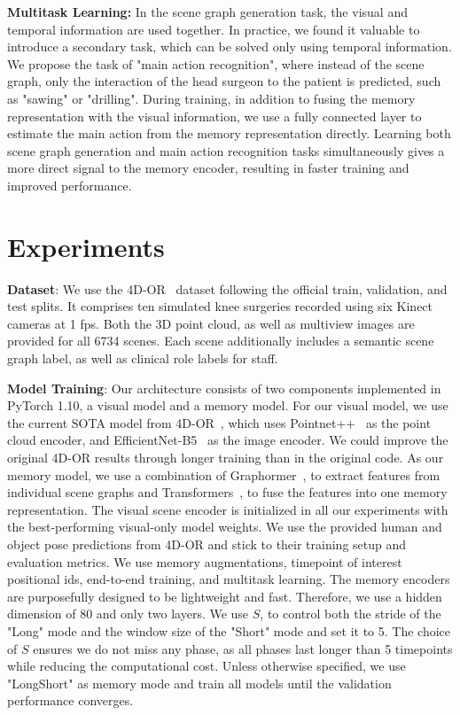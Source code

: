 \documentclass[runningheads]{llncs}
\begin{document}
\noindent \textbf{Multitask Learning:}
In the scene graph generation task, the visual and temporal information are used together. In practice, we found it valuable to introduce a secondary task, which can be solved only using temporal information. We propose the task of "main action recognition", where instead of the scene graph, only the interaction of the head surgeon to the patient is predicted, such as "sawing" or "drilling". During training, in addition to fusing the memory representation with the visual information,  we use a fully connected layer to estimate the main action from the memory representation directly. Learning both scene graph generation and main action recognition tasks simultaneously gives a more direct signal to the memory encoder, resulting in faster training and improved performance. 

\section{Experiments}
\noindent \textbf{Dataset}: We use the 4D-OR~\cite{ozsoy20224d} dataset following the official train, validation, and test splits. It comprises ten simulated knee surgeries recorded using six Kinect cameras at 1 fps. Both the 3D point cloud, as well as multiview images are provided for all 6734 scenes. Each scene additionally includes a semantic scene graph label, as well as clinical role labels for staff.

\noindent \textbf{Model Training}: Our architecture consists of two components implemented in PyTorch 1.10, a visual model and a memory model. For our visual model, we use the current SOTA model from 4D-OR~\cite{ozsoy20224d}, which uses Pointnet++~\cite{pointnet++} as the point cloud encoder, and EfficientNet-B5~\cite{efficientnet} as the image encoder. We could improve the original 4D-OR results through longer training than in the original code. As our memory model, we use a combination of Graphormer~\cite{graphormer}, to extract features from individual scene graphs and Transformers~\cite{transformers}, to fuse the features into one memory representation. The visual scene encoder is initialized in all our experiments with the best-performing visual-only model weights. We use the provided human and object pose predictions from 4D-OR and stick to their training setup and evaluation metrics. We use memory augmentations, timepoint of interest positional ids, end-to-end training, and multitask learning. The memory encoders are purposefully designed to be lightweight and fast. Therefore, we use a hidden dimension of 80 and only two layers. We use $S$, to control both the stride of the "Long" mode and the window size of the "Short" mode and set it to 5. The choice of $S$ ensures we do not miss any phase, as all phases last longer than 5 timepoints while reducing the computational cost. Unless otherwise specified, we use "LongShort" as memory mode and train all models until the validation performance converges.
\end{document}
